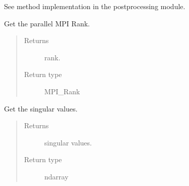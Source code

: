 \documentclass[letterpaper,10pt,english]{sphinxmanual}
\begin{document}
\begin{fulllineitems}
\begin{fulllineitems}
\label{\detokenize{index:pyparsvd.parsvd_base.ParSVD_Base.plot_singular_values}}
\sphinxAtStartPar
See method implementation in the postprocessing module.

\end{fulllineitems}


\begin{fulllineitems}
\label{\detokenize{index:pyparsvd.parsvd_base.ParSVD_Base.rank}}
\sphinxAtStartPar
Get the parallel MPI Rank.
\begin{quote}\begin{description}
\item[{Returns}] \leavevmode
\sphinxAtStartPar
rank.

\item[{Return type}] \leavevmode
\sphinxAtStartPar
MPI\_Rank

\end{description}\end{quote}

\end{fulllineitems}


\begin{fulllineitems}
\label{\detokenize{index:pyparsvd.parsvd_base.ParSVD_Base.singular_values}}
\sphinxAtStartPar
Get the singular values.
\begin{quote}\begin{description}
\item[{Returns}] \leavevmode
\sphinxAtStartPar
singular values.

\item[{Return type}] \leavevmode
\sphinxAtStartPar
ndarray

\end{description}\end{quote}

\end{fulllineitems}


\end{fulllineitems}
\end{document}
